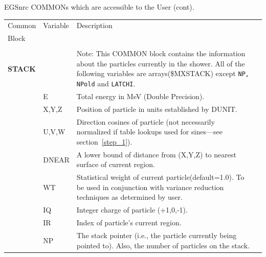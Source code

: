 \begin{table}[htb]

       
        
    


       
        
    


    \begin{center}
    EGSnrc COMMONs which are accessible to the User (cont).
    \begin{tabular}{ l  l   p{105mm}l  |}
    \hline
    Common & Variable & Description \\
    Block &&\\
    \hline
&&\\
{\bfseries STACK}	&	&Note: This COMMON block contains the
                            information about the particles
                            currently in the shower.  All
                            of the following variables are
                            arrays(\$MXSTACK) except {\tt NP, NPold}  and
                            {\tt LATCHI}.\\
	&E	&Total energy in MeV (Double
                            Precision).\\
	& X,Y,Z & Position of particle in units
                            established by DUNIT.\\
	&U,V,W	&Direction cosines of particle (not
                            necessarily normalized if table lookups used
                      for sines---see section~\ref{step_1}).\\
	&DNEAR	&A lower bound of distance from
                            (X,Y,Z) to nearest surface of
                            current region.\\
	& WT	&Statistical weight of current particle(default=1.0).  To be
		used in conjunction with variance reduction techniques as
                determined by user.\\
	& IQ	&Integer charge of particle
                            (+1,0,-1).\\
	&IR	&Index of particle's current region.\\

	& NP	& The stack pointer (i.e., the particle currently being pointed
                            to).  Also, the number of particles on the stack.\\


\end{tabular}
\end{center}
\end{table}
